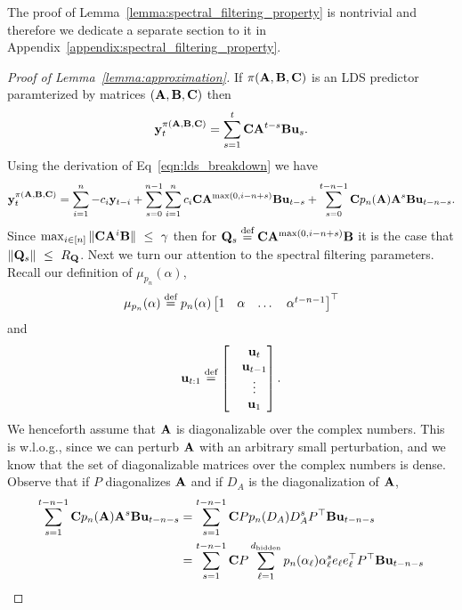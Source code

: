 The proof of Lemma~\ref{lemma:spectral_filtering_property} is nontrivial and therefore we dedicate a separate section to it in Appendix~\ref{appendix:spectral_filtering_property}. 
\begin{proof}[Proof of Lemma~\ref{lemma:approximation}]
If $\pi(\mathbf{A}, \mathbf{B}, \mathbf{C})$ is an LDS predictor paramterized by matrices $(\mathbf{A}, \mathbf{B}, \mathbf{C})$ then
\begin{equation*}
 \mathbf{y}_t^{\pi(\mathbf{A}, \mathbf{B}, \mathbf{C})} = \sum_{s = 1}^{t} \mathbf{C} \mathbf{A}^{t-s} \mathbf{B} \mathbf u_{s}.
\end{equation*}
Using the derivation of Eq~\eqref{eqn:lds_breakdown} we have
\begin{equation}
\label{eqn:helper}
     \mathbf{y}_t^{\pi(\mathbf{A}, \mathbf{B}, \mathbf{C})} = \sum_{i = 1}^n -c_i \mathbf{y}_{t-i} + \sum_{s = 0}^{n-1} \sum_{i = 1}^n c_i \mathbf{C}\mathbf{A}^{\max (0, i-n+s)} \mathbf{B} \mathbf u_{t-s} + \sum_{s = 0}^{t-n-1} \mathbf{C} p_n(\mathbf{A}) \mathbf{A}^s \mathbf{B} \mathbf u_{t-n-s}.
\end{equation}
Since $\max_{i \in [n]} \|\mathbf{C}\mathbf{A}^i \mathbf{B}\| ~\le~ \gamma$ then for $\mathbf{Q}_s \stackrel{\text{def}}{=} \mathbf{C}\mathbf{A}^{\max (0, i-n+s)} \mathbf{B} $ it is the case that $\|\mathbf{Q}_s\| ~\le~ R_{\mathbf{Q}}$. Next we turn our attention to the spectral filtering parameters. Recall our definition of $\mu_{p_n}(\alpha)$,
\begin{equation*}
    \mu_{p_n}(\alpha) \stackrel{\text{def}}{=} p_n(\alpha) \begin{bmatrix}
        1 & \alpha & \dots & \alpha^{t-n-1}
    \end{bmatrix}^{\top}
\end{equation*}
and
\begin{equation}
    \mathbf u_{t:1} \stackrel{\text{def}}{=} \begin{bmatrix}
        & \mathbf u_t \\
        & \mathbf u_{t-1} \\
        & \vdots \\
        & \mathbf u_1
    \end{bmatrix}.
\end{equation}
We henceforth assume that $\mathbf{A}$ is diagonalizable over the complex numbers. This is w.l.o.g., since we can perturb $\mathbf{A}$ with an arbitrary small perturbation, and we know that the set of diagonalizable matrices over the complex numbers is dense.  
Observe that if $P$ diagonalizes $\mathbf{A}$ and if $D_A$ is the diagonalization of $\mathbf{A}$, 
\begin{align*}
    \sum_{s = 1}^{t-n-1} \C p_n(\A) \A^s \B \uv_{t-n-s} & =  \sum_{s = 1}^{t-n-1} \C P  p_n(D_A) D_A^s P^{\top} \B \uv_{t-n-s}  \\
     & =  \sum_{s = 1}^{t-n-1} \C P  \sum_{\ell = 1}^{d_{\textrm{hidden}}}  p_n(\alpha_{\ell}) \alpha_{\ell}^s e_{\ell} e_{\ell}^{\top}  P^{\top} \B \uv_{t-n-s}  \\

\end{align*}
\end{proof}
